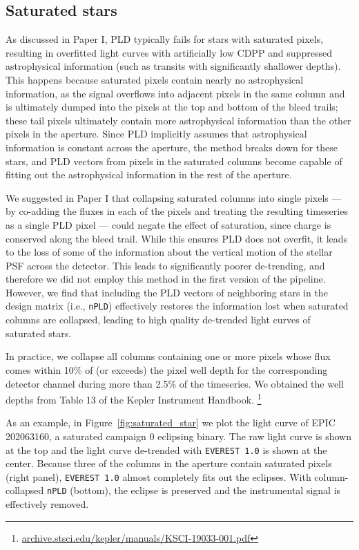 \documentclass[]{emulateapj}
\begin{document}
\subsection{Saturated stars}
\label{sec:impl_saturated}
As discussed in Paper I, PLD typically fails for stars with saturated pixels, resulting
in overfitted light curves with artificially low CDPP and suppressed astrophysical 
information (such as transits with significantly shallower depths). This happens because
saturated pixels contain nearly no astrophysical information, as the signal
overflows into adjacent pixels in the same column and is ultimately dumped into the
pixels at the top and bottom of the bleed trails; these tail pixels ultimately contain more 
astrophysical information than the other pixels in the aperture. Since PLD implicitly
assumes that astrophysical information is constant across the aperture, the method
breaks down for these stars, and PLD vectors from pixels in the saturated columns become capable
of fitting out the astrophysical information in the rest of the aperture.

We suggested in Paper I that collapsing saturated columns into single pixels --- by co-adding
the fluxes in each of the pixels and treating the resulting timeseries as a single PLD pixel ---
could negate the effect of saturation, since charge is conserved along the bleed trail. While
this ensures PLD does not overfit, it leads to the loss of some of the information about the 
vertical motion of the stellar PSF across the detector. This leads to significantly poorer
de-trending, and therefore we did not employ this method in the first version of the pipeline.
However, we find that including the PLD vectors of neighboring stars in the design matrix 
(i.e., \texttt{nPLD}) effectively restores the information lost when saturated columns are 
collapsed, leading to high quality de-trended light curves of saturated stars. 

In practice, we collapse all columns containing one or more pixels whose flux 
comes within 10\% of (or exceeds)
the pixel well depth for the corresponding detector channel during more than 2.5\% of the
timeseries. We obtained the well depths from
Table 13 of the Kepler Instrument Handbook.
\footnote{\url{archive.stsci.edu/kepler/manuals/KSCI-19033-001.pdf}} 

As an example, in Figure~\ref{fig:saturated_star} we plot the light curve of EPIC 202063160, a saturated
campaign 0 eclipsing binary. The raw light curve is shown at the top and the light curve
de-trended with \texttt{EVEREST 1.0} is shown at the center. Because three of the columns
in the aperture contain saturated pixels (right panel), \texttt{EVEREST 1.0} almost 
completely fits out the eclipses. With column-collapsed \texttt{nPLD} (bottom), the
eclipse is preserved and the instrumental signal is effectively removed.
\end{document}
